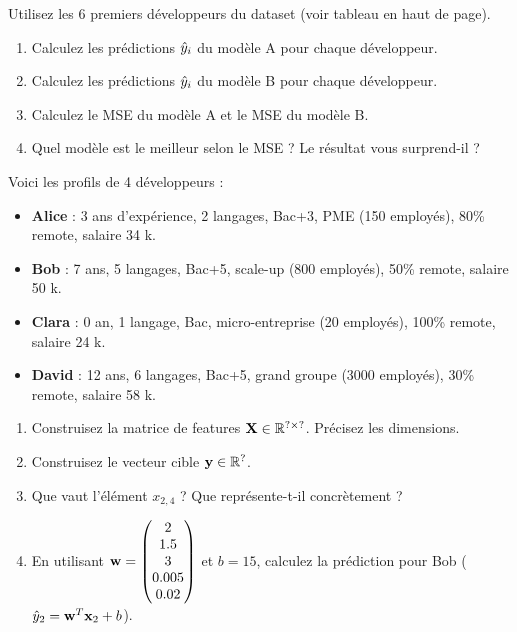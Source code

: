 Utilisez les 6 premiers d\'{e}veloppeurs du dataset (voir tableau en haut de page).

\begin{enumerate}[label=\alph*)]
    \item Calculez les pr\'{e}dictions $\hat{y}_i$ du mod\`{e}le A pour chaque d\'{e}veloppeur.

    \item Calculez les pr\'{e}dictions $\hat{y}_i$ du mod\`{e}le B pour chaque d\'{e}veloppeur.

    \item Calculez le MSE du mod\`{e}le A et le MSE du mod\`{e}le B.

    \item Quel mod\`{e}le est le meilleur selon le MSE ? Le r\'{e}sultat vous surprend-il ?
\end{enumerate}


Voici les profils de 4 d\'{e}veloppeurs :

\begin{itemize}
    \item \textbf{Alice} : 3 ans d'exp\'{e}rience, 2 langages, Bac+3, PME (150 employ\'{e}s),
        80\% remote, salaire 34 k\texteuro.
    \item \textbf{Bob} : 7 ans, 5 langages, Bac+5, scale-up (800 employ\'{e}s),
        50\% remote, salaire 50 k\texteuro.
    \item \textbf{Clara} : 0 an, 1 langage, Bac, micro-entreprise (20 employ\'{e}s),
        100\% remote, salaire 24 k\texteuro.
    \item \textbf{David} : 12 ans, 6 langages, Bac+5, grand groupe (3000 employ\'{e}s),
        30\% remote, salaire 58 k\texteuro.
\end{itemize}

\begin{enumerate}[label=\alph*)]
    \item Construisez la matrice de features $\mathbf{X} \in \mathbb{R}^{? \times ?}$.
        Pr\'{e}cisez les dimensions.

    \item Construisez le vecteur cible $\mathbf{y} \in \mathbb{R}^{?}$.

    \item Que vaut l'\'{e}l\'{e}ment $x_{2,4}$ ? Que repr\'{e}sente-t-il concr\`{e}tement ?

    \item En utilisant $\mathbf{w} = \begin{pmatrix} 2 \\ 1.5 \\ 3 \\ 0.005 \\ 0.02 \end{pmatrix}$ et $b = 15$,
        calculez la pr\'{e}diction pour Bob ($\hat{y}_2 = \mathbf{w}^T \mathbf{x}_2 + b$).
\end{enumerate}

